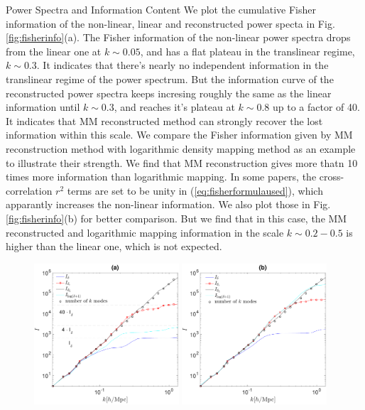 \begin{section}{Power Spectra and Information Content}
  We plot the 
cumulative Fisher information of the non-linear, linear and reconstructed power specta in 
Fig.\ref{fig:fisherinfo}(a). The Fisher information of the non-linear power spectra drops 
from the linear one at $k \sim 0.05$, and has a flat plateau in the translinear regime, $k\sim0.3$. It 
indicates that there's nearly no independent information in the translinear regime of the power 
spectrum.
But the information curve of 
the reconstructed power spectra keeps incresing roughly the same as 
the linear information until $k\sim0.3$, and reaches it's plateau at $k\sim0.8$ 
up to a factor of 40. It indicates that MM reconstructed method can strongly recover the lost information 
within this scale. We compare the Fisher information given by MM reconstruction method with 
logarithmic density mapping method \cite{bib:Mark2009} as an example to illustrate their strength. 
We find that MM reconstruction gives more thatn 10 times more information than logarithmic mapping. 
In some papers, the cross-correlation $r^2$ terms are set to be unity in (\ref{eq:fisherformulaused}), which 
apparantly increases the non-linear information. We also plot those in Fig. \ref{fig:fisherinfo}(b) 
for better comparison. But we find that in this case, the MM reconstructed and logarithmic mapping information in the scale 
$k \sim 0.2 - 0.5$ is higher than the linear one, which is not expected. 
\begin{figure}
  \includegraphics[width=0.48\textwidth]{fisher_addlog_r2_analysis-crop.pdf}
  \includegraphics[width=0.48\textwidth]{fisher_addlog_analysis-crop.pdf}

\end{figure}
\end{section}
